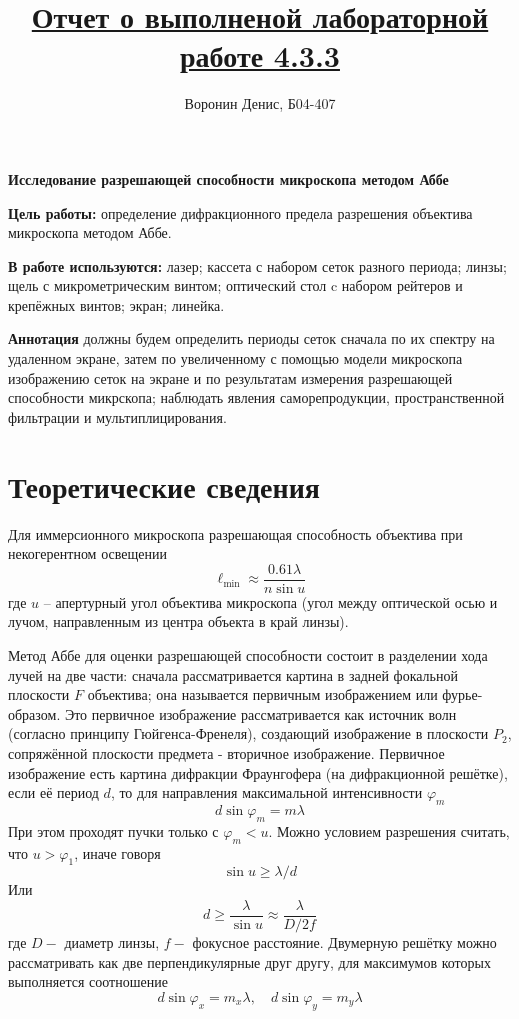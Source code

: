 \documentclass[a4paper]{article}
\title{\underline{Отчет о выполненой лабораторной работе 4.3.3}}
\author{Воронин Денис, Б04-407}
\begin{document}
\maketitle

\begin{center}
\textbf{\Large Исследование разрешающей способности
микроскопа методом Аббе}
\end{center}

\textbf{Цель работы:} определение дифракционного предела разрешения
объектива микроскопа методом Аббе.

\textbf{В работе используются:}  лазер; кассета с набором сеток разного
периода; линзы; щель с микрометрическим винтом; оптический стол
c набором рейтеров и крепёжных винтов; экран; линейка.

\textbf{Аннотация} должны будем определить периоды сеток сначала по их спектру на удаленном экране, затем по увеличенному с помощью модели микроскопа
изображению сеток на экране и по результатам измерения разрешающей способности микрскопа; наблюдать явления саморепродукции, пространственной фильтрации и мультиплицирования.

\section{Теоретические сведения}

Для иммерсионного микроскопа разрешающая способность объектива при
некогерентном освещении $$ \ell_{\min } \approx \frac{0.61 \lambda}{n \sin u}
$$ где $u$ -- апертурный угол объектива микроскопа (угол между оптической осью
и лучом, направленным из центра объекта в край линзы).

Метод Аббе для оценки разрешающей способности состоит в разделении хода лучей
на две части: сначала рассматривается картина в задней фокальной плоскости $F$
объектива; она называется первичным изображением или фурье-образом. Это
первичное изображение рассматривается как источник волн (согласно принципу
Гюйгенса-Френеля), создающий изображение в плоскости $P_{2}$, сопряжённой
плоскости предмета - вторичное изображение. Первичное изображение есть картина
дифракции Фраунгофера (на дифракционной решётке), если её период $d$, то для
направления максимальной интенсивности $\varphi_{m}$ $$ d \sin \varphi_{m}=m
    \lambda $$ При этом проходят пучки только с $\varphi_{m}<u .$ Можно условием
разрешения считать, что $u>\varphi_{1}$, иначе говоря $$ \sin u \geq \lambda /
    d $$ Или $$ d \geq \frac{\lambda}{\sin u} \approx \frac{\lambda}{D / 2 f} $$
где $D-$ диаметр линзы, $f-$ фокусное расстояние. Двумерную решётку можно
рассматривать как две перпендикулярные друг другу, для максимумов которых
выполняется соотношение $$ d \sin \varphi_{x}=m_{x} \lambda, \quad d \sin
    \varphi_{y}=m_{y} \lambda $$
\end{document}
